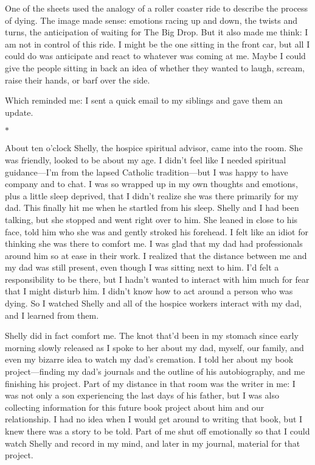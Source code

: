 \documentclass[12pt]{book}
\begin{document}
One of the sheets used the analogy of a roller coaster ride to describe the process of dying. The image made sense: emotions racing up and down, the twists and turns, the anticipation of waiting for The Big Drop. But it also made me think: I am not in control of this ride. I might be the one sitting in the front car, but all I could do was anticipate and react to whatever was coming at me. Maybe I could give the people sitting in back an idea of whether they wanted to laugh, scream, raise their hands, or barf over the side.

Which reminded me: I sent a quick email to my siblings and gave them an update.

\begin{center}$*$\end{center}

About ten o'clock Shelly, the hospice spiritual advisor, came into the room. She was friendly, looked to be about my age. I didn't feel like I needed spiritual guidance---I'm from the lapsed Catholic tradition---but I was happy to have company and to chat. I was so wrapped up in my own thoughts and emotions, plus a little sleep deprived, that I didn't realize she was there primarily for my dad. This finally hit me when he startled from his sleep. Shelly and I had been talking, but she stopped and went right over to him. She leaned in close to his face, told him who she was and gently stroked his forehead. I felt like an idiot for thinking she was there to comfort me. I was glad that my dad had professionals around him so at ease in their work. I realized that the distance between me and my dad was still present, even though I was sitting next to him. I'd felt a responsibility to be there, but I hadn't wanted to interact with him much for fear that I might disturb him. I didn't know how to act around a person who was dying. So I watched Shelly and all of the hospice workers interact with my dad, and I learned from them.

Shelly did in fact comfort me. The knot that'd been in my stomach since early morning slowly released as I spoke to her about my dad, myself, our family, and even my bizarre idea to watch my dad's cremation. I told her about my book project---finding my dad's journals and the outline of his autobiography, and me finishing his project. Part of my distance in that room was the writer in me: I was not only a son experiencing the last days of his father, but I was also collecting information for this future book project about him and our relationship. I had no idea when I would get around to writing that book, but I knew there was a story to be told. Part of me shut off emotionally so that I could watch Shelly and record in my mind, and later in my journal, material for that project.
\end{document}
